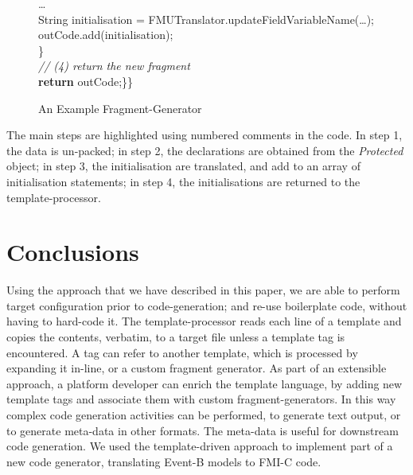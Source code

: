 \documentclass{llncs}%
\begin{document}
\begin{figure}
\begin{minipage}{0.85\textwidth}
\hspace*{0.4cm}\ldots\\
\hspace*{0.4cm}String initialisation = FMUTranslator.updateFieldVariableName(\ldots);\\
\hspace*{0.4cm}outCode.add(initialisation);\\
\hspace*{0.2cm}\}\\
\hspace*{0.2cm}\emph{// (4) return the new fragment}\\
\hspace*{0.2cm}\textbf{return} outCode;\}\}
\end{minipage}
\caption{An Example Fragment-Generator}
\label{fig:genCode}
\end{figure}
%
%
The main steps are highlighted using numbered comments in the code. In step 1, the data is un-packed; in step 2, the declarations are obtained from the \emph{Protected} object; in step 3, the initialisation are translated, and add to an array of initialisation statements; in step 4, the initialisations are returned to the template-processor. 
%
\section{Conclusions}\label{conc}
Using the approach that we have described in this paper, we are able to perform target configuration prior to code-generation; and re-use boilerplate code, without having to hard-code it. The template-processor reads each line of a template and copies the contents, verbatim, to a target file unless a template tag is encountered. A tag can refer to another template, which is processed by expanding it in-line, or a custom fragment generator. As part of an extensible approach, a platform developer can enrich the template language, by adding new template tags and associate them with custom fragment-generators. In this way complex code generation activities can be performed, to generate text output, or  to generate meta-data in other formats. The meta-data is useful for downstream code generation. We used the template-driven approach to implement part of a new code generator, translating Event-B models to FMI-C code. 
%


%
%
%
\end{document}
